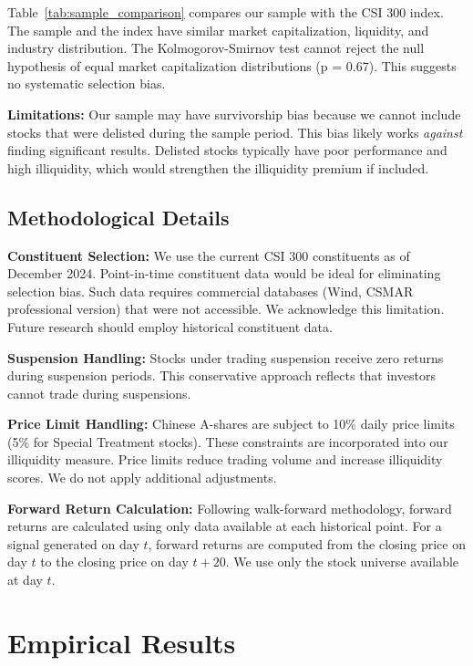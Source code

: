 Table~\ref{tab:sample_comparison} compares our sample with the CSI 300 index. The sample and the index have similar market capitalization, liquidity, and industry distribution. The Kolmogorov-Smirnov test cannot reject the null hypothesis of equal market capitalization distributions (p = 0.67). This suggests no systematic selection bias.

\textbf{Limitations:} Our sample may have survivorship bias because we cannot include stocks that were delisted during the sample period. This bias likely works \textit{against} finding significant results. Delisted stocks typically have poor performance and high illiquidity, which would strengthen the illiquidity premium if included.

\subsection{Methodological Details}

\textbf{Constituent Selection:} We use the current CSI 300 constituents as of December 2024. Point-in-time constituent data would be ideal for eliminating selection bias. Such data requires commercial databases (Wind, CSMAR professional version) that were not accessible. We acknowledge this limitation. Future research should employ historical constituent data.

\textbf{Suspension Handling:} Stocks under trading suspension receive zero returns during suspension periods. This conservative approach reflects that investors cannot trade during suspensions.

\textbf{Price Limit Handling:} Chinese A-shares are subject to 10\% daily price limits (5\% for Special Treatment stocks). These constraints are incorporated into our illiquidity measure. Price limits reduce trading volume and increase illiquidity scores. We do not apply additional adjustments.

\textbf{Forward Return Calculation:} Following walk-forward methodology, forward returns are calculated using only data available at each historical point. For a signal generated on day $t$, forward returns are computed from the closing price on day $t$ to the closing price on day $t+20$. We use only the stock universe available at day $t$.

\section{Empirical Results}
\label{sec:results}

